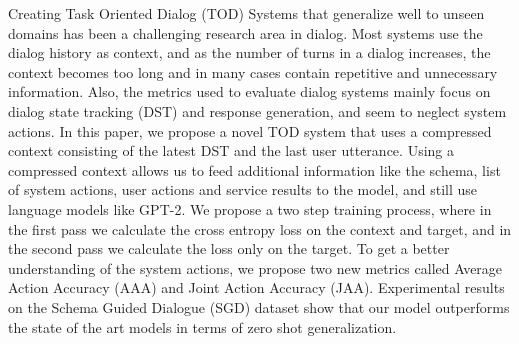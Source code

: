 Creating Task Oriented Dialog (TOD) Systems that generalize well to unseen domains has been a challenging research area in dialog.
Most systems use the dialog history as context, and as the number of turns in a dialog increases, the context becomes too long and in many cases contain
repetitive and unnecessary information. Also, the metrics used to evaluate dialog systems mainly focus on dialog state tracking (DST) and response generation, and seem to
neglect system actions. In this paper, we propose a novel TOD system that uses a compressed context consisting of the latest DST and the last user utterance.
Using a compressed context allows us to feed additional information like the schema, list of system actions, user actions and service results to the model, and still use
language models like GPT-2. We propose a two step training process, where in the first pass we calculate the cross entropy loss on the context and target, and
in the second pass we calculate the loss only on the target.
To get a better understanding of the system actions, we propose two new metrics called Average Action Accuracy (AAA) and Joint Action Accuracy (JAA).
Experimental results on the Schema Guided Dialogue (SGD) dataset show that our model outperforms the state of the art models in terms of zero shot generalization.
